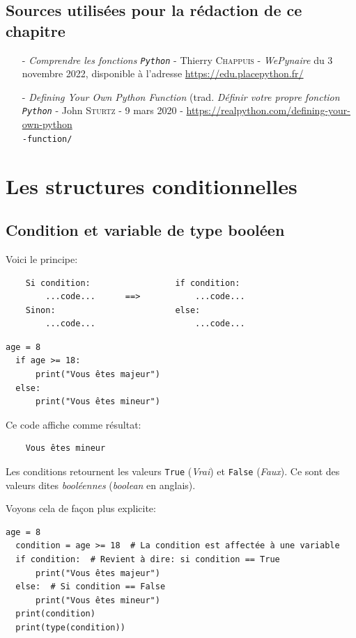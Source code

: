 \documentclass[a4paper,12pt]{book}
\begin{document}
\section*{Sources utilisées pour la rédaction de ce chapitre}
\begin{itemize}
	\item[-] \textit{Comprendre les fonctions \texttt{Python}} - Thierry \textsc{Chappuis} - \textit{WePynaire} du 3 novembre 2022, disponible à l'adresse \url{https://edu.placepython.fr/}
	\item[-] \textit{Defining Your Own Python Function} (trad. \textit{Définir votre propre fonction \texttt{Python}} - John \textsc{Sturtz} - 9 mars 2020 - \url{https://realpython.com/defining-your-own-python}\\ \texttt{-function/} 
\end{itemize}
\medskip

\chapter{Les structures conditionnelles}\label{struct_cond}
\section{Condition et variable de type \og booléen\fg}
Voici le principe:
\begin{verbatim}
    Si condition:                 if condition:
        ...code...      ==>           ...code...
    Sinon:                        else:
        ...code...                    ...code...
\end{verbatim}
\medskip

\begin{lstlisting}[caption=Un premier exemple de structure conditionnelle]
  age = 8
  if age >= 18:
  	  print("Vous êtes majeur")
  else:
  	  print("Vous êtes mineur")
\end{lstlisting}
\medskip

Ce code affiche comme résultat:
\begin{verbatim}
    Vous êtes mineur
\end{verbatim}
\medskip

Les conditions retournent les valeurs \texttt{True} (\textit{Vrai}) et \texttt{False} (\textit{Faux}). Ce sont des valeurs dites \textit{booléennes} (\textit{boolean} en anglais).
\medskip

Voyons cela de façon plus explicite:
\begin{lstlisting}[caption=Les valeurs \textit{booléennes}]
  age = 8
  condition = age >= 18  # La condition est affectée à une variable
  if condition:  # Revient à dire: si condition == True
  	  print("Vous êtes majeur")
  else:  # Si condition == False
  	  print("Vous êtes mineur")
  print(condition)
  print(type(condition))
\end{lstlisting}
\medskip
\end{document}
